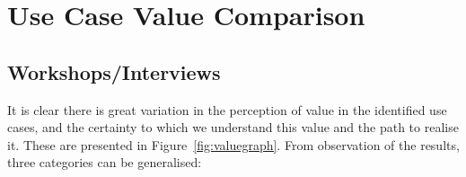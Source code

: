 \documentclass[journal]{IEEEtran}
\begin{document}



\section{Use Case Value Comparison}\label{usecasecomp}

\subsection{Workshops/Interviews}

It is clear there is great variation in the perception of value in the
identified use cases, and the certainty to which we understand this
value and the path to realise it. These are presented in
Figure~\ref{fig:valuegraph}. From observation of the results, three
categories can be generalised:
\end{document}
